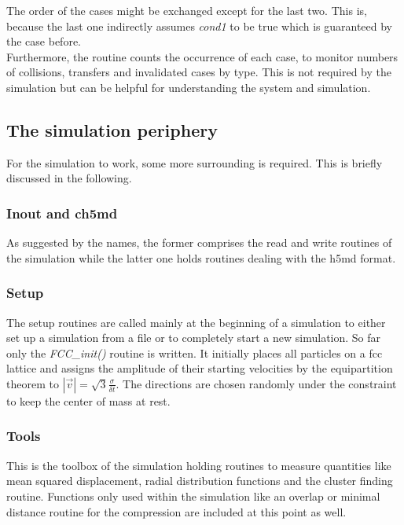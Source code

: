The order of the cases might be exchanged except for the last two. This is, because the last one indirectly assumes \textit{cond1} to be true which is guaranteed by the case before.\\

Furthermore, the routine counts the occurrence of each case, to monitor numbers of collisions, transfers and invalidated cases by type. This is not required by the simulation but can be helpful for understanding the system and simulation.

\subsection{The simulation periphery}
For the simulation to work, some more surrounding is required. This is briefly discussed in the following.
 
\subsubsection{Inout and ch5md}
As suggested by the names, the former comprises the read and write routines of the simulation while the latter one holds routines dealing with the h5md format.

\subsubsection{Setup}
The setup routines are called mainly at the beginning of a simulation to either set up a simulation from a file or to completely start a new simulation. So far only the \textit{FCC\_init()} routine is written. It initially places all particles on a fcc lattice and assigns the amplitude of their starting velocities by the equipartition theorem to $|\vec{v}| = \sqrt{3}\frac{\sigma}{\delta t}$. The directions are chosen randomly under the constraint to keep the center of mass at rest.

\subsubsection{Tools}
This is the toolbox of the simulation holding routines to measure quantities like mean squared displacement, radial distribution functions and the cluster finding routine. Functions only used within the simulation like an overlap or minimal distance routine for the compression are included at this point as well.\\

